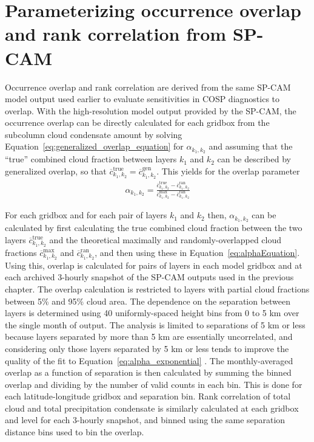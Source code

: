 \section{Parameterizing occurrence overlap and rank correlation from
SP-CAM}\label{sec:subgrid2Overlap}

Occurrence overlap and rank correlation are derived from the same SP-CAM
model output used earlier to evaluate sensitivities in COSP diagnostics
to overlap. With the high-resolution model output provided by the
SP-CAM, the occurrence overlap can be directly calculated for each
gridbox from the subcolumn cloud condensate amount by solving
Equation~\ref{eq:generalized_overlap_equation} for \(\alpha_{k_1, k_2}\)
and assuming that the ``true'' combined cloud fraction between layers
\(k_1\) and \(k_2\) can be described by generalized overlap, so that
\(\overline{c}^\textrm{true}_{k_1, k_2} = \overline{c}^\textrm{gen}_{k_1, k_2}\).
This yields for the overlap parameter \begin{equation}\begin{gathered} 
    \alpha_{k_1, k_2} = \frac{
        \overline{c}^\textrm{true}_{k_1, k_2} 
            - \overline{c}^\textrm{ran}_{k_1, k_2} 
    }{
        \overline{c}^\textrm{max}_{k_1, k_2} 
            - \overline{c}^\textrm{ran}_{k_1, k_2} 
    }
\end{gathered}\label{eq:alphaEquation}\end{equation}

For each gridbox and for each pair of layers \(k_1\) and \(k_2\) then,
\(\alpha_{k_1, k_2}\) can be calculated by first calculating the true
combined cloud fraction between the two layers
\(\overline{c}^\textrm{true}_{k_1, k_2}\) and the theoretical maximally
and randomly-overlapped cloud fractions
\(\overline{c}^\textrm{max}_{k_1, k_2}\) and
\(\overline{c}^\textrm{ran}_{k_1, k_2}\), and then using these in
Equation~\ref{eq:alphaEquation}. Using this, overlap is calculated for
pairs of layers in each model gridbox and at each archived 3-hourly
snapshot of the SP-CAM outputs used in the previous chapter. The overlap
calculation is restricted to layers with partial cloud fractions between
5\% and 95\% cloud area. The dependence on the separation between layers
is determined using 40 uniformly-spaced height bins from 0 to 5 km over
the single month of output. The analysis is limited to separations of 5
km or less because layers separated by more than 5 km are essentially
uncorrelated, and considering only those layers separated by 5 km or
less tends to improve the quality of the fit to
Equation~\ref{eq:alpha_exponential} \citep{pincus_et_al_2005}. The
monthly-averaged overlap as a function of separation is then calculated
by summing the binned overlap and dividing by the number of valid counts
in each bin. This is done for each latitude-longitude gridbox and
separation bin. Rank correlation of total cloud and total precipitation
condensate is similarly calculated at each gridbox and level for each
3-hourly snapshot, and binned using the same separation distance bins
used to bin the overlap.

